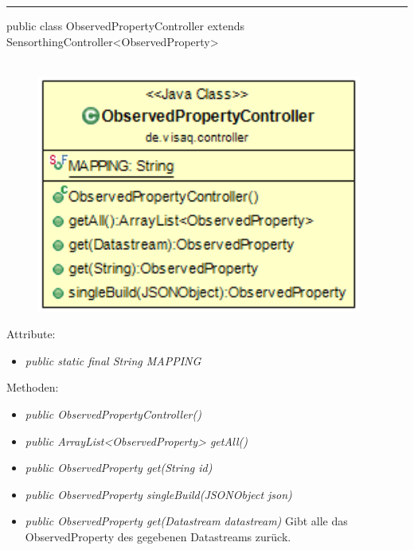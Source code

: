 \rule{\textwidth}{0.4pt}
public class ObservedPropertyController extends SensorthingController<ObservedProperty>
\\\\
\begin{minipage}{0.35\textwidth}
    \begin{figure}[H]
        {\centering\includegraphics[width=0.95\textwidth]{media/backend/controller/classes/ObservedPropertyController.png}}
    \end{figure}
    \end{minipage} \hfill
\begin{minipage}{0.65\textwidth}
\end{minipage}

Attribute:
\begin{itemize}
    \item \emph{public static final String MAPPING} \mappingDescription
\end{itemize}
Methoden:
\begin{itemize}
    \item \emph{public ObservedPropertyController()}
    \item \emph{public ArrayList<ObservedProperty> getAll()}
    \extendsSensorthingController
    \item \emph{public ObservedProperty get(String id)}
    \extendsSensorthingController
    \item \emph{public ObservedProperty singleBuild(JSONObject json)}
    \extendsSensorthingController
    \item \emph{public ObservedProperty get(Datastream datastream)}
    Gibt alle das ObservedProperty des gegebenen Datastreams zurück.
\end{itemize}

